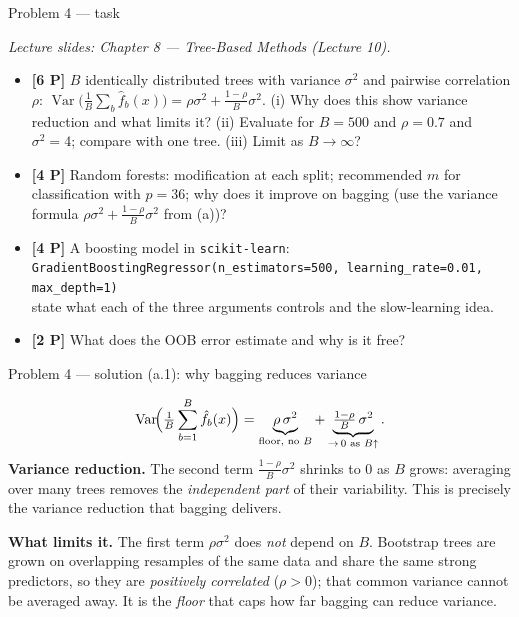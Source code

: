 \documentclass[aspectratio=169,11pt]{beamer}
\begin{document}
\begin{frame}{Problem 4 --- task}
  \begin{exercise}
    {\scriptsize\itshape Lecture slides: Chapter 8 --- Tree-Based Methods (Lecture 10).}\par\smallskip
    \begin{itemize}
      \item[(a)] \textbf{[6 P]} $B$ identically distributed trees with variance $\sigma^2$ and
        pairwise correlation $\rho$:
        $\operatorname{Var}\bigl(\frac1B\sum_b\hat f_b(x)\bigr)=\rho\sigma^2+\frac{1-\rho}{B}\sigma^2$.
        (i) Why does this show variance reduction and what limits it?
        (ii) Evaluate for $B=500$ and $\rho=0.7$ and $\sigma^2=4$; compare with one tree.
        (iii) Limit as $B\to\infty$?
      \item[(b)] \textbf{[4 P]} Random forests: modification at each split; recommended $m$
        for classification with $p=36$; why does it improve on bagging (use the variance formula
        $\rho\sigma^2+\frac{1-\rho}{B}\sigma^2$ from (a))?
      \item[(c)] \textbf{[4 P]} A boosting model in \texttt{scikit-learn}:\\
        {\scriptsize\texttt{GradientBoostingRegressor(n\_estimators=500, learning\_rate=0.01, max\_depth=1)}}\\
        state what each of the three arguments controls and the slow-learning idea.
      \item[(d)] \textbf{[2 P]} What does the OOB error estimate and why is it free?
    \end{itemize}
  \end{exercise}
\end{frame}

\begin{frame}{Problem 4 --- solution (a.1): why bagging reduces variance}
  \begin{solutionbox}
    \[
      \operatorname{Var}\!\Bigl(\tfrac1B\sum_{b=1}^B \hat f_b(x)\Bigr)
      =\underbrace{\rho\,\sigma^2}_{\text{floor, no }B}
      +\underbrace{\tfrac{1-\rho}{B}\,\sigma^2}_{\to\,0\text{ as }B\uparrow}.
    \]
    \textbf{Variance reduction.} The second term $\frac{1-\rho}{B}\sigma^2$ shrinks to $0$ as $B$
    grows: averaging over many trees removes the \emph{independent part} of their variability. This
    is precisely the variance reduction that bagging delivers.
    \medskip

    \textbf{What limits it.} The first term $\rho\sigma^2$ does \emph{not} depend on $B$. Bootstrap
    trees are grown on overlapping resamples of the same data and share the same strong predictors,
    so they are \emph{positively correlated} ($\rho>0$); that common variance cannot be averaged
    away. It is the \emph{floor} that caps how far bagging can reduce variance.
  \end{solutionbox}
\end{frame}
\end{document}
